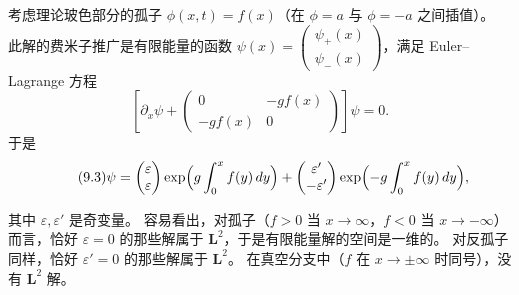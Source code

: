 考虑理论玻色部分的孤子 $\phi(x,t)=f(x)$（在 $\phi=a$ 与 $\phi=-a$ 之间插值）。
此解的费米子推广是有限能量的函数 $\psi(x)=\begin{pmatrix}\psi_+(x)\\ \psi_-(x)\end{pmatrix}$，满足 Euler–Lagrange 方程
\begin{equation}
  \tag{9.2}
  \label{eq:9-2}
  \left[\partial_x\psi+\begin{pmatrix}0&-gf(x)\\-gf(x)&0\end{pmatrix}\right]\psi=0.
\end{equation}
于是
\begin{equation}
  \tag{9.3}
  \label{eq:9-3}
  \psi=\begin{pmatrix}\varepsilon\\ \varepsilon\end{pmatrix}
  \exp\Bigl(g\int_0^x f(y)\,dy\Bigr)
  +\begin{pmatrix}\varepsilon'\\ -\varepsilon'\end{pmatrix}
  \exp\Bigl(-g\int_0^x f(y)\,dy\Bigr),
\end{equation}


其中 $\varepsilon,\varepsilon'$ 是奇变量。
容易看出，对孤子（$f>0$ 当 $x\to\infty$，$f<0$ 当 $x\to-\infty$）而言，恰好 $\varepsilon=0$ 的那些解属于 $\mathbf{L}^2$，于是有限能量解的空间是一维的。
对反孤子同样，恰好 $\varepsilon'=0$ 的那些解属于 $\mathbf{L}^2$。
在真空分支中（$f$ 在 $x\to\pm\infty$ 时同号），没有 $\mathbf{L}^2$ 解。


